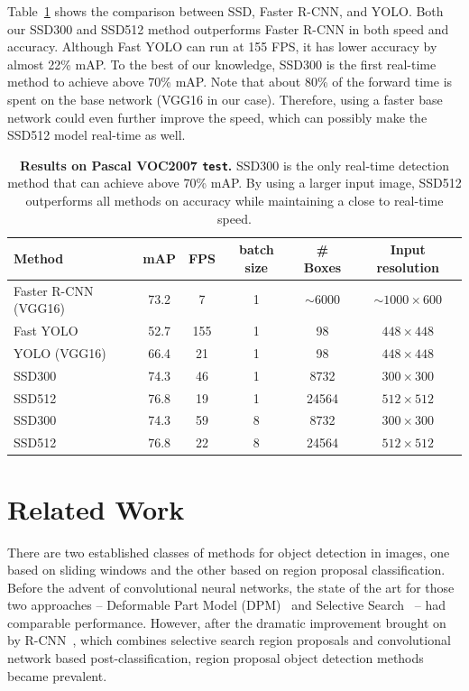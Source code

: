 \documentclass[runningheads]{llncs}
\begin{document}
Table~\ref{tab:inference} shows the comparison between SSD, Faster R-CNN\cite{ren2015faster}, and YOLO\cite{redmon2015you}. Both our SSD300 and SSD512 method outperforms Faster R-CNN in both speed and accuracy. Although Fast YOLO\cite{redmon2015you} can run at 155 FPS, it has lower accuracy by almost 22\% mAP. To the best of our knowledge, SSD300 is the first real-time method to achieve above 70\% mAP. Note that about 80\% of the forward time is spent on the base network (VGG16 in our case). Therefore, using a faster base network could even further improve the speed, which can possibly make the SSD512 model real-time as well.
\begin{table}
	\centering
    \setlength{\tabcolsep}{5pt}
    \begin{tabular}{l|c|c|c|c|c}
		Method & mAP & FPS & batch size & \# Boxes & Input resolution \\
        \hline
        Faster R-CNN (VGG16) & 73.2 & 7 & 1 & $\sim6000$ & $\sim1000\times600$\\
        \hline 
        Fast YOLO & 52.7 & 155 & 1 & 98 & $448\times448$\\
        YOLO (VGG16) & 66.4 & 21 & 1 & 98 & $448\times448$\\
        \hline
        SSD300 & 74.3 & 46 & 1 & 8732 & $300\times300$ \\
        SSD512 & 76.8 & 19 & 1 & 24564 & $512\times512$ \\
        SSD300 & 74.3 & 59 & 8 & 8732 & $300\times300$ \\
        SSD512 & 76.8 & 22 & 8 & 24564 & $512\times512$ \\
	\end{tabular}
    \caption{\textbf{Results on Pascal VOC2007 \texttt{test}.} SSD300 is the only real-time detection method that can achieve above 70\% mAP. By using a larger input image, SSD512 outperforms all methods on accuracy while maintaining a close to real-time speed.}
    \label{tab:inference}
\end{table}

\section{Related Work}
\label{sec:relatedwork}
There are two established classes of methods for object detection in images, one based on sliding windows and the other based on region proposal classification. Before the advent of convolutional neural networks, the state of the art for those two approaches -- Deformable Part Model (DPM)~\cite{felzenszwalb2008discriminatively} and Selective Search~\cite{uijlings2013selective} -- had comparable performance. However, after the dramatic improvement brought on by R-CNN~\cite{girshick2014rich}, which combines selective search region proposals and convolutional network based post-classification, region proposal object detection methods became prevalent.
\end{document}
